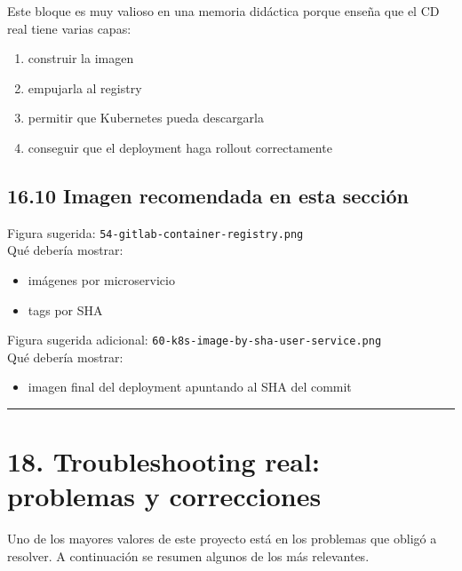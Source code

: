 \documentclass[
a4paper,
12pt]{report}
\providecommand{\tightlist}{%
  \setlength{\itemsep}{0pt}\setlength{\parskip}{0pt}}
\begin{document}
Este bloque es muy valioso en una memoria didáctica porque enseña que el
CD real tiene varias capas:

\begin{enumerate}
\def\labelenumi{\arabic{enumi}.}
\tightlist
\item
  construir la imagen\\
\item
  empujarla al registry\\
\item
  permitir que Kubernetes pueda descargarla\\
\item
  conseguir que el deployment haga rollout correctamente
\end{enumerate}

\section{16.10 Imagen recomendada en esta
sección}\label{imagen-recomendada-en-esta-secciuxf3n-10}

Figura sugerida: \texttt{54-gitlab-container-registry.png}\\
Qué debería mostrar:

\begin{itemize}
\tightlist
\item
  imágenes por microservicio
\item
  tags por SHA
\end{itemize}

Figura sugerida adicional:
\texttt{60-k8s-image-by-sha-user-service.png}\\
Qué debería mostrar:

\begin{itemize}
\tightlist
\item
  imagen final del deployment apuntando al SHA del commit
\end{itemize}

\begin{center}\rule{0.5\linewidth}{0.5pt}\end{center}

\chapter{18. Troubleshooting real: problemas y
correcciones}\label{troubleshooting-real-problemas-y-correcciones}

Uno de los mayores valores de este proyecto está en los problemas que
obligó a resolver. A continuación se resumen algunos de los más
relevantes.
\end{document}
